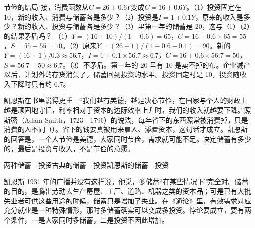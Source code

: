 \begin{example}{节俭的结局}\label{ex:generaltheory-thrift}
接，消费函数从$C=26+0.6Y$变成$C=16+0.6Y$。（1）投资固定在 10，新的收入、消费与储蓄各是多少？（2）投资是$I=1+0.1Y$，原来的收入是多少？新的收入、投资与储蓄各是多少？（3）里第一年的储蓄是 20，这与（1）（2）的结果矛盾吗？
\solution （1）$Y=(16+10)/(1-0.6)=65$，$C=16+0.6\times65=55$，$S=65-55=10$。（2）原来$Y=(26+1)/(1-0.6-0.1)=90$。新的$Y=(16+1)/0.3\approx56.7$，$I=1+0.1\times56.7\approx6.7$，$C=16+0.6\times56.7=50$，$S=56.7-50\approx6.7$。（3）不矛盾。第一年的 20 里有 10 是卖不掉的布。企业减产以后，计划外的存货消失了，储蓄回到投资的水平。投资固定时是 10，投资随收入下降时只有约 6.7。
\end{example}

凯恩斯在书里说得更重：“我们越有美德，越是决心节俭，在国家与个人的财政上越是顽固地守旧，利率相对于资本的边际效率上升时，我们的收入就越要下降。”\cite{keynes1936}照斯密（Adam Smith，1723—1790）的说法，每年省下的东西照常被消费掉，只是消费的人不同（）\cite{smith1776,loc32}。省下的钱要真被用来雇人、添置资本，这句话才成立。凯恩斯的回答是，一个人节俭是美德，大家同时节俭，需求就可能不足。决定储蓄有多少的，最后是投资与收入，不是节俭的意愿。

\begin{compare}{两种储蓄—投资}{古典的储蓄—投资}{凯恩斯的储蓄—投资}
\end{compare}

\begin{pitfall}[节俭悖论说储蓄总是坏事]
凯恩斯 1931 年的广播并没有这样说。他说，多储蓄“在某些情况下”完全对\cite{keynes1931b}。储蓄的目的，是腾出劳动去生产房屋、工厂、道路、机器之类的资本品；可是已有大批失业者可供这些用途的时候，储蓄只是增加了失业\cite{keynes1931b}。在《通论》里，有效需求对应充分就业是一种特殊情形，那时多储蓄确实可以变成多投资。悖论要成立，要有两个条件，一是大家同时多储蓄，二是投资不因此增加。
\end{pitfall}

